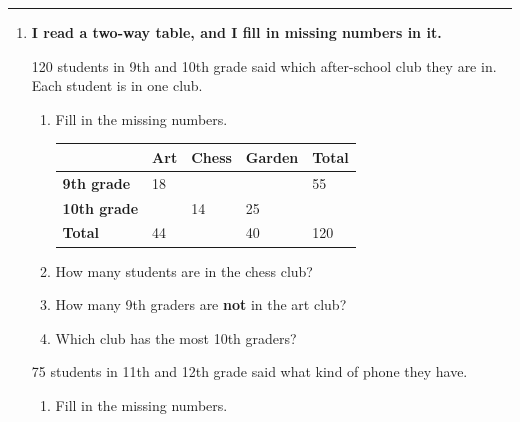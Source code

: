 \documentclass[11pt]{article}
\newcommand{\lessonhead}[1]{\par\vspace{0.6em}{\large\bfseries #1}\par\vspace{0.25em}\hrule\vspace{0.6em}}
\newcommand{\goal}[1]{\textbf{#1}\par\vspace{0.35em}}
\begin{document}
\newpage
\lessonhead{3.1 - Two-Way Tables and Relative Frequency}
\begin{enumerate}

\item \goal{I read a two-way table, and I fill in missing numbers in it.}
120 students in 9th and 10th grade said which after-school club they are in. Each student is in one club.
\begin{enumerate}
  \item Fill in the missing numbers.

  \begin{center}
  \renewcommand{\arraystretch}{1.9}
  \begin{tabular}{|l|C{0.9in}|C{0.9in}|C{0.9in}|C{0.9in}|}\hline
   & \textbf{Art} & \textbf{Chess} & \textbf{Garden} & \textbf{Total} \\ \hline
  \textbf{9th grade} & 18 &  &  & 55 \\ \hline
  \textbf{10th grade} &  & 14 & 25 &  \\ \hline
  \textbf{Total} & 44 &  & 40 & 120 \\ \hline
  \end{tabular}
  \end{center}
  \work{5em}
  \item How many students are in the chess club? 
  \item How many 9th graders are \textbf{not} in the art club? 
  \item Which club has the most 10th graders? 
\end{enumerate}

\vspace{1em}
75 students in 11th and 12th grade said what kind of phone they have.
\begin{enumerate}[start=5]
  \item Fill in the missing numbers.


\end{enumerate}
\end{enumerate}
\end{document}
